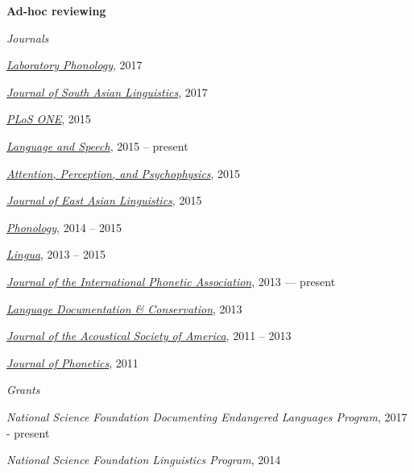 \documentclass[10pt]{article}
\newcommand{\blankline}{\quad\pagebreak[3]}
\begin{document}
\blankline

\textbf{Ad-hoc reviewing}

\begin{outerlist}

    \item[] \textit{Journals}%

      \begin{innerlist}
      \item
        \href{http://www.journal-labphon.org/}{\emph{Laboratory Phonology}}, 2017
      \item
        \href{http://jsal-journal.org/}{\emph{Journal of South Asian Linguistics}}, 2017
      \item
        \href{http://www.plosone.org/}{\emph{PLoS ONE}}, 2015
      \item
        \href{http://las.sagepub.com}{\emph{Language
            and Speech}}, 2015 -- present
      \item
        \href{http://www.springer.com/psychology/cognitive+psychology/journal/13414}{\emph{Attention,
            Perception, and Psychophysics}}, 2015
      \item
        \href{http://link.springer.com/journal/10831}{\emph{Journal of East Asian Linguistics}},
        2015
      \item
        \href{http://journals.cambridge.org/action/displayJournal?jid=PHO}{\emph{Phonology}},
        2014 -- 2015
      \item \href{http://www.journals.elsevier.com/lingua/}{\emph{Lingua}}, 2013 -- 2015
        \item
          \href{http://journals.cambridge.org/action/displayJournal?jid=IPA}{\emph{Journal
              of the International Phonetic Association}}, 2013 --- present
        \item \href{http://nflrc.hawaii.edu/ldc/}{\emph{Language Documentation \& Conservation}}, 2013
        \item \href{http://asadl.org/jasa/}{\emph{Journal of the Acoustical Society of America}}, 2011 -- 2013
        \item \href{http://www.journals.elsevier.com/journal-of-phonetics/}{\emph{Journal of Phonetics}}, 2011
      \end{innerlist}

    \item[] \textit{Grants}%

      \begin{innerlist}
      \item \emph{National Science Foundation Documenting Endangered Languages Program}, 2017 - present
      \item \emph{National Science Foundation Linguistics Program}, 2014
      \end{innerlist}


\end{outerlist}
\end{document}
